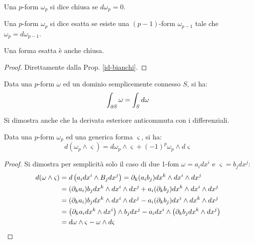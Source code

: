 \begin{definition}
	Una $ p $-form $ \omega_p $ si dice chiusa se $ d\omega_p = 0 $.
\end{definition}

\begin{definition}
	Una $ p $-form $ \omega_p $ si dice esatta se esiste una $ (p-1) $-form $ \omega_{p-1} $ tale che $ \omega_p = d\omega_{p-1} $.
\end{definition}

\begin{proposition}
	Una forma esatta è anche chiusa.
\end{proposition}
\begin{proof}
	Direttamente dalla Prop. \ref{id-bianchi}.
\end{proof}

\begin{theorem}[di Stokes]\label{th-stokes}
	Data una $ p $-form $ \omega $ ed un dominio semplicemente connesso $ S $, si ha:
	\begin{equation}
		\int_{\partial S} \omega = \int_S d\omega
		\label{eq:3.11}
	\end{equation}
\end{theorem}

Si dimostra anche che la derivata esteriore anticommuta con i differenziali.

\begin{proposition}
	Data una $ p $-form $ \omega_p $ ed una generica forma $ \varsigma $, si ha:
	\begin{equation}
		d(\omega_p \wedge \varsigma) = d\omega_p \wedge \varsigma + (-1)^p \omega_p \wedge d\varsigma
		\label{eq:3.12}
	\end{equation}
\end{proposition}
\begin{proof}
	Si dimostra per semplicità solo il caso di due 1-fom $ \omega = a_i dx^i $ e $ \varsigma = b_j dx^j $:
	\begin{equation*}
		\begin{split}
			d(\omega \wedge \varsigma) &= d\left( a_i  dx^i \wedge B_j dx^j \right) = \partial_k (a_i b_j) dx^k \wedge dx^i \wedge dx^j\\
						   &= (\partial_k a_i) b_j dx^k \wedge dx^i \wedge dx^j + a_i (\partial_k b_j) dx^k \wedge dx^i \wedge dx^j\\
						   &= (\partial_k a_i) b_j dx^k \wedge dx^i \wedge dx^j - a_i (\partial_k b_j) dx^i \wedge dx^k \wedge dx^j\\
						   &= \left( \partial_k a_i dx^k \wedge dx^i \right) \wedge b_j dx^j - a_i dx^i \wedge \left( \partial_k b_j dx^k \wedge dx^j \right)\\
						   &= d\omega \wedge \varsigma - \omega \wedge d\varsigma
		\end{split}
	\end{equation*}
\end{proof}

